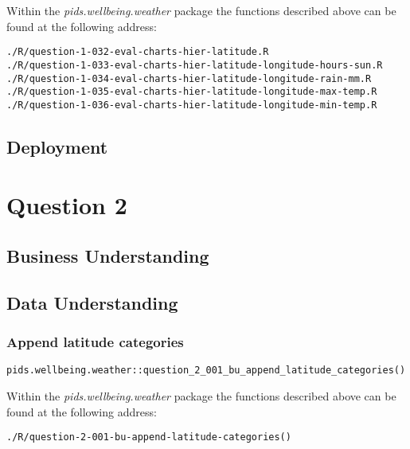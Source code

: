 \documentclass[12pt, oneside, openany]{book}
\begin{document}
Within the \emph{pids.wellbeing.weather} package the functions described above can be found at the following address:

\begin{verbatim}
./R/question-1-032-eval-charts-hier-latitude.R
./R/question-1-033-eval-charts-hier-latitude-longitude-hours-sun.R
./R/question-1-034-eval-charts-hier-latitude-longitude-rain-mm.R
./R/question-1-035-eval-charts-hier-latitude-longitude-max-temp.R
./R/question-1-036-eval-charts-hier-latitude-longitude-min-temp.R
\end{verbatim}

\section*{Deployment}

\setcounter{equation}{0}
\chapter*{Question 2}

\section*{Business Understanding}

\section*{Data Understanding}

\subsection*{Append latitude categories}

\begin{verbatim}
pids.wellbeing.weather::question_2_001_bu_append_latitude_categories()
\end{verbatim}

Within the \emph{pids.wellbeing.weather} package the functions described above can be found at the following address:

\begin{verbatim}
./R/question-2-001-bu-append-latitude-categories()
\end{verbatim}
\end{document}
